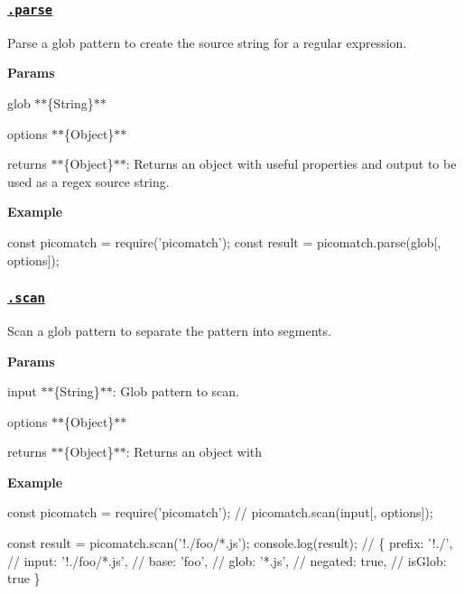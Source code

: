 \subsubsection*{\href{lib/picomatch.js#L191}{\tt .parse}}

Parse a glob pattern to create the source string for a regular expression.

{\bfseries Params}


\begin{DoxyItemize}
\item {\ttfamily glob} $\ast$$\ast$\{String\}$\ast$$\ast$
\item {\ttfamily options} $\ast$$\ast$\{Object\}$\ast$$\ast$
\item {\ttfamily returns} $\ast$$\ast$\{Object\}$\ast$$\ast$\+: Returns an object with useful properties and output to be used as a regex source string.
\end{DoxyItemize}

{\bfseries Example}


\begin{DoxyCode}
const picomatch = require('picomatch');
const result = picomatch.parse(glob[, options]);
\end{DoxyCode}


\subsubsection*{\href{lib/picomatch.js#L215}{\tt .scan}}

Scan a glob pattern to separate the pattern into segments.

{\bfseries Params}


\begin{DoxyItemize}
\item {\ttfamily input} $\ast$$\ast$\{String\}$\ast$$\ast$\+: Glob pattern to scan.
\item {\ttfamily options} $\ast$$\ast$\{Object\}$\ast$$\ast$
\item {\ttfamily returns} $\ast$$\ast$\{Object\}$\ast$$\ast$\+: Returns an object with
\end{DoxyItemize}

{\bfseries Example}


\begin{DoxyCode}
const picomatch = require('picomatch');
// picomatch.scan(input[, options]);

const result = picomatch.scan('!./foo/*.js');
console.log(result);
// \{ prefix: '!./',
//   input: '!./foo/*.js',
//   base: 'foo',
//   glob: '*.js',
//   negated: true,
//   isGlob: true \}
\end{DoxyCode}


